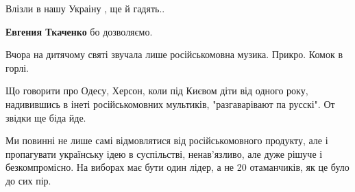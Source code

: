 \begin{itemize}
 
Влізли в нашу Украіну , ще й гадять..

\begin{itemize}
 
\textbf{Евгения Ткаченко} бо дозволяємо.
\end{itemize}

 
Вчора на дитячому святі звучала лише російськомовна музика. Прикро. Комок в горлі.

 

Що говорити про Одесу, Херсон, коли під Києвом діти від одного року,
надивившись в інеті російськомовних мультиків, "разгаварівают па русскі". От
звідки ще біда йде.


 

Ми повинні не лише самі відмовлятися від російськомовного продукту, але і
пропагувати українську ідею в суспільстві, ненав'язливо, але дуже рішуче і
безкомпромісно. На виборах має бути один лідер, а не 20 отаманчиків, як це було
до сих пір.


 


\end{itemize}
